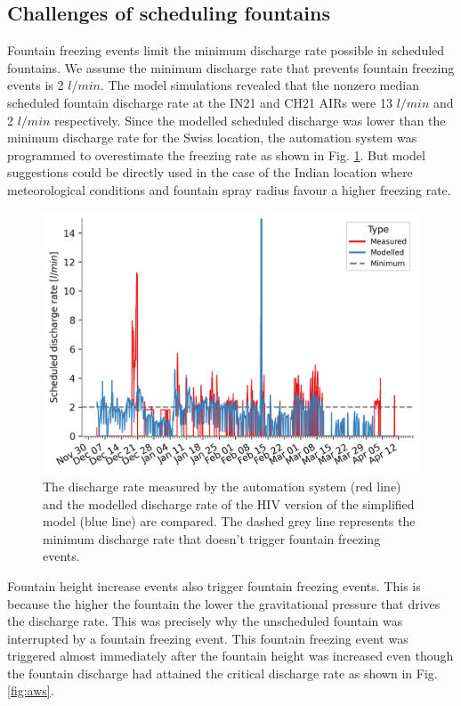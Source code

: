 \documentclass[tc, manuscript]{copernicus}
\begin{document}
\subsection{Challenges of scheduling fountains}

Fountain freezing events limit the minimum discharge rate possible in scheduled fountains.  We assume the
minimum discharge rate that prevents fountain freezing events is 2 $l/min$. The model simulations revealed that
the nonzero median scheduled fountain discharge rate at the IN21 and CH21 AIRs were 13 $l/min$ and 2 $l/min$
respectively. Since the modelled scheduled discharge was lower than the minimum discharge rate for the Swiss
location, the automation system was programmed to overestimate the freezing rate as shown in Fig.
\ref{fig:simvsreal}. But model suggestions could be directly used in the case of the Indian location where
meteorological conditions and fountain spray radius favour a higher freezing rate. 

\begin{figure}[t]
\includegraphics[width=12cm]{Figures/simvsreal.png}

\caption{ The discharge rate measured by the automation system (red line) and the modelled discharge rate of the HIV version
  of the simplified model (blue line) are compared. The dashed grey line represents the minimum discharge rate
that doesn't trigger fountain freezing events. }

\label{fig:simvsreal}
\end{figure}

Fountain height increase events also trigger fountain freezing events. This is because the higher the fountain
the lower the gravitational pressure that drives the discharge rate. This was precisely why the unscheduled
fountain was interrupted by a fountain freezing event. This fountain freezing event was triggered almost
immediately after the fountain height was increased even though the fountain discharge had attained the critical
discharge rate as shown in Fig. \ref{fig:aws}. 
\end{document}
